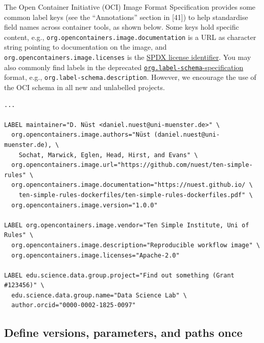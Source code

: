\documentclass[10pt,letterpaper]{article}
\begin{document}
The Open Container Initiative (OCI) Image Format Specification provides
some common label keys (see the ``Annotations'' section in {[}41{]}) to
help standardise field names across container tools, as shown below.
Some keys hold specific content, e.g.,
\texttt{org.opencontainers.image.documentation} is a URL as character
string pointing to documentation on the image, and
\texttt{org.opencontainers.image.licenses} is the
\href{https://spdx.org/licenses/}{SPDX license identifier}. You may also
commonly find labels in the deprecated
\href{http://label-schema.org/rc1/}{\texttt{org.label-schema}-specification}
format, e.g., \texttt{org.label-schema.description}. However, we
encourage the use of the OCI schema in all new and unlabelled projects.

\scriptsize

\begin{minipage}{\linewidth}

\begin{lstlisting}[language=docker,caption={Partial \texttt{Dockerfile} with commonly used labels.},breaklines=true,label={lst:labels}]
...

LABEL maintainer="D. Nüst <daniel.nuest@uni-muenster.de>" \
  org.opencontainers.image.authors="Nüst (daniel.nuest@uni-muenster.de), \
    Sochat, Marwick, Eglen, Head, Hirst, and Evans" \
  org.opencontainers.image.url="https://github.com/nuest/ten-simple-rules" \
  org.opencontainers.image.documentation="https://nuest.github.io/ \
    ten-simple-rules-dockerfiles/ten-simple-rules-dockerfiles.pdf" \
  org.opencontainers.image.version="1.0.0"

LABEL org.opencontainers.image.vendor="Ten Simple Institute, Uni of Rules" \
  org.opencontainers.image.description="Reproducible workflow image" \
  org.opencontainers.image.licenses="Apache-2.0"

LABEL edu.science.data.group.project="Find out something (Grant #123456)" \
  edu.science.data.group.name="Data Science Lab" \
  author.orcid="0000-0002-1825-0097"
\end{lstlisting}

\end{minipage}

\normalsize

\hypertarget{define-versions-parameters-and-paths-once}{%
\subsection{Define versions, parameters, and paths
once}\label{define-versions-parameters-and-paths-once}}
\end{document}
